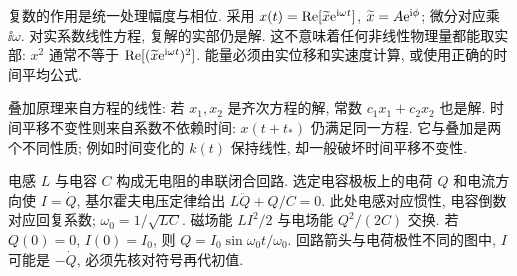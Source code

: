 复数的作用是统一处理幅度与相位. 采用 $x(t)=\operatorname{Re}[\widetilde x\mathrm e^{\mathrm i\omega t}]$, $\widetilde x=A\mathrm e^{\mathrm i\phi}$; 微分对应乘 $\ii\omega$. 对实系数线性方程, 复解的实部仍是解. 这不意味着任何非线性物理量都能取实部: $x^2$ 通常不等于 $\operatorname{Re}[(\widetilde x\mathrm e^{\mathrm i\omega t})^2]$. 能量必须由实位移和实速度计算, 或使用正确的时间平均公式.

叠加原理来自方程的线性: 若 $x_1,x_2$ 是齐次方程的解, 常数 $c_1x_1+c_2x_2$ 也是解. 时间平移不变性则来自系数不依赖时间: $x(t+t_*)$ 仍满足同一方程. 它与叠加是两个不同性质; 例如时间变化的 $k(t)$ 保持线性, 却一般破坏时间平移不变性.

电感 $L$ 与电容 $C$ 构成无电阻的串联闭合回路. 选定电容极板上的电荷 $Q$ 和电流方向使 $I=\dot Q$, 基尔霍夫电压定律给出 $L\ddot Q+Q/C=0$. 此处电感对应惯性, 电容倒数对应回复系数; $\omega_0=1/\sqrt{LC}$. 磁场能 $LI^2/2$ 与电场能 $Q^2/(2C)$ 交换. 若 $Q(0)=0$, $I(0)=I_0$, 则 $Q=I_0\sin\omega_0t/\omega_0$. 回路箭头与电荷极性不同的图中, $I$ 可能是 $-\dot Q$, 必须先核对符号再代初值.

